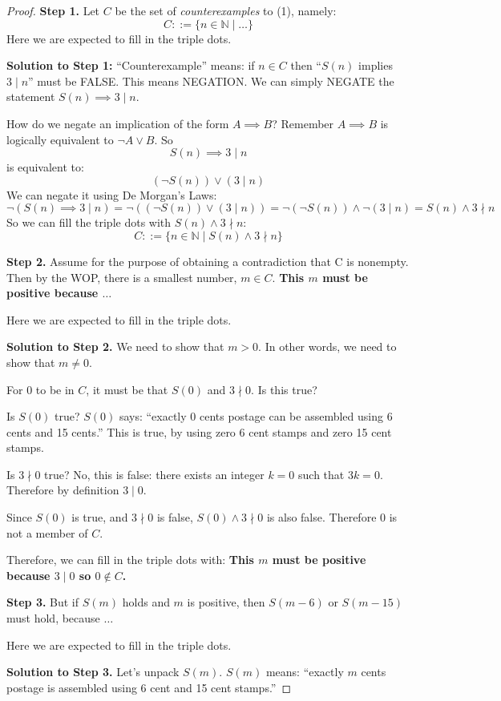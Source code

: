 \documentclass[14pt]{extarticle}
\begin{document}
\begin{proof}
{\bf Step 1.} Let $C$ be the set of {\it counterexamples} to (1), namely:
$$
C::= \{n \in \mathbb{N} \mid \ldots\}
$$
Here we are expected to fill in the triple dots.

{\bf Solution to Step 1:} ``Counterexample'' means: if $n \in C$ then ``$S(n)$ implies $3 \mid n$'' must be FALSE. This means NEGATION. We can simply NEGATE the statement $S(n) \implies 3 \mid n$.

How do we negate an implication of the form $A \implies B$? Remember $A \implies B$ is logically equivalent to $\neg A \vee B$.
So
$$
S(n) \implies 3 \mid n 
$$
is equivalent to:
$$
(\neg S(n)) \vee (3 \mid n)
$$
We can negate it using De Morgan's Laws:
$$
\neg(S(n) \implies 3 \mid n) = \neg((\neg S(n)) \vee (3 \mid n)) = \neg(\neg S(n)) \wedge \neg(3 \mid n) = S(n) \wedge 3 \nmid n
$$
So we can fill the triple dots with $S(n) \wedge 3 \nmid n$:
$$
C::= \{n \in \mathbb{N} \mid S(n) \wedge 3 \nmid n\}
$$

{\bf Step 2.} Assume for the purpose of obtaining a contradiction that C is nonempty. Then by the WOP, there is a smallest number, $m \in C$. \textbf{This $m$ must be positive because $\ldots$}

Here we are expected to fill in the triple dots. 

{\bf Solution to Step 2.} We need to show that $m > 0$. In other words, we need to show that $m \neq 0$.

For $0$ to be in $C$, it must be that $S(0)$ and $3 \nmid 0$. Is this true?

Is $S(0)$ true? $S(0)$ says: ``exactly 0 cents postage can be assembled using 6 cents and 15 cents.'' This is true, by using zero 6 cent stamps and zero 15 cent stamps.

Is $3 \nmid 0$ true? No, this is false: there exists an integer $k = 0$ such that $3k = 0$. Therefore by definition $3 \mid 0$.

Since $S(0)$ is true, and $3 \nmid 0$ is false, $S(0) \wedge 3 \nmid 0$ is also false. Therefore $0$ is not a member of $C$.

Therefore, we can fill in the triple dots with: \textbf{This $m$ must be positive because $3 \mid 0$ so $0 \notin C$.}

{\bf Step 3.} But if $S(m)$ holds and $m$ is positive, then $S(m - 6)$ or $S(m - 15)$ must hold, because $\ldots$

Here we are expected to fill in the triple dots. 

{\bf Solution to Step 3.} Let's unpack $S(m)$. $S(m)$ means: ``exactly $m$ cents postage is assembled using 6 cent and 15 cent stamps.''


\end{proof}
\end{document}
